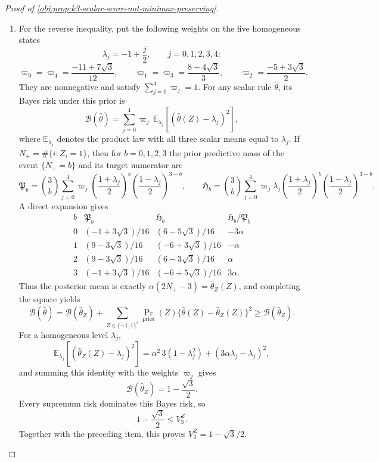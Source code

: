 \begin{proof}[Proof of \cref{obj:prop:k3-scalar-score-not-minimax-preserving}]
\begin{enumerate}
\item
For the reverse inequality, put the following weights on the five homogeneous states
\[
\lambda_j=-1+\frac j2,\qquad j=0,1,2,3,4:
\]
\[
\varpi_0=\varpi_4=\frac{-11+7\sqrt3}{12},\qquad
\varpi_1=\varpi_3=\frac{8-4\sqrt3}{3},\qquad
\varpi_2=\frac{-5+3\sqrt3}{2}.
\]
They are nonnegative and satisfy \(\sum_{j=0}^4\varpi_j=1\). For any scalar rule \(\widehat\theta\), its Bayes risk under this prior is
\[
\mathcal B(\widehat\theta)
=\sum_{j=0}^4\varpi_j\,
\mathbb E_{\lambda_j}\!\left[(\widehat\theta(Z)-\lambda_j)^2\right],
\]
where \(\mathbb E_{\lambda_j}\) denotes the product law with all three scalar means equal to \(\lambda_j\). If \(N_+=\#\{i:Z_i=1\}\), then for \(b=0,1,2,3\) the prior predictive mass of the event \(\{N_+=b\}\) and its target numerator are
\[
\mathfrak P_b
=\binom{3}{b}\sum_{j=0}^4\varpi_j
\left(\frac{1+\lambda_j}{2}\right)^b
\left(\frac{1-\lambda_j}{2}\right)^{3-b},
\qquad
\mathfrak H_b
=\binom{3}{b}\sum_{j=0}^4\varpi_j\lambda_j
\left(\frac{1+\lambda_j}{2}\right)^b
\left(\frac{1-\lambda_j}{2}\right)^{3-b}.
\]
A direct expansion gives
\[
\begin{array}{c|c|c|c}
b&\mathfrak P_b&\mathfrak H_b&\mathfrak H_b/\mathfrak P_b\\ \hline
0&(-1+3\sqrt3)/16&(6-5\sqrt3)/16&-3\alpha\\
1&(9-3\sqrt3)/16&(-6+3\sqrt3)/16&-\alpha\\
2&(9-3\sqrt3)/16&(6-3\sqrt3)/16&\alpha\\
3&(-1+3\sqrt3)/16&(-6+5\sqrt3)/16&3\alpha .
\end{array}
\]
Thus the posterior mean is exactly \(\alpha(2N_+-3)=\widehat\theta_Z(Z)\), and completing the square yields
\[
\mathcal B(\widehat\theta)
=
\mathcal B(\widehat\theta_Z)
+\sum_{Z\in\{-1,1\}^3}
\Pr_{\mathrm{prior}}(Z)
\{\widehat\theta(Z)-\widehat\theta_Z(Z)\}^2
\ge \mathcal B(\widehat\theta_Z).
\]
For a homogeneous level \(\lambda_j\),
\[
\mathbb E_{\lambda_j}\!\left[(\widehat\theta_Z(Z)-\lambda_j)^2\right]
=
\alpha^2\,3(1-\lambda_j^2)+(3\alpha\lambda_j-\lambda_j)^2,
\]
and summing this identity with the weights \(\varpi_j\) gives
\[
\mathcal B(\widehat\theta_Z)=1-\frac{\sqrt3}{2}.
\]
Every supremum risk dominates this Bayes risk, so
\[
1-\frac{\sqrt3}{2}\le V_3^Z .
\]
Together with the preceding item, this proves \(V_3^Z=1-\sqrt3/2\). %


\end{enumerate}
\end{proof}
